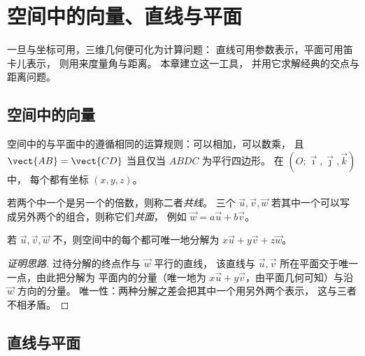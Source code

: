 \chapter{空间中的向量、直线与平面}\label{ch:g12:space}

一旦与坐标可用，三维几何便可化为计算问题：
直线可用参数表示，平面可用笛卡儿表示，
则用来度量角与距离。
本章建立这一工具，
并用它求解经典的交点与距离问题。

\section{空间中的向量}

空间中的与平面中的遵循相同的运算规则：可以相加，可以数乘，
且 $\vect{AB} = \vect{CD}$ 当且仅当 $ABDC$ 为平行四边形。
在 $(O; \vec\imath, \vec\jmath, \vec k)$ 中，
每个都有坐标 $(x, y, z)$。

\begin{definition}[共线与共面]\label{def:g12:space:collinear}
若两个中一个是另一个的倍数，则称二者\emph{共线}。
三个 $\vec u, \vec v, \vec w$ 若其中一个可以写成另外两个的组合，则称它们\emph{共面}，
例如
$\vec w = a\vec u + b\vec v$。
\end{definition}

\begin{proposition}\label{prop:g12:space:basis}
若 $\vec u, \vec v, \vec w$ 不，则空间中的每个都可唯一地分解为
$x\vec u + y\vec v + z\vec w$。
\end{proposition}

\begin{proof}[证明思路]
过待分解的终点作与 $\vec w$ 平行的直线，
该直线与 $\vec u, \vec v$ 所在平面交于唯一一点，由此把分解为
平面内的分量（唯一地为 $x\vec u + y\vec
v$，由平面几何可知）与沿 $\vec w$ 方向的分量。
唯一性：两种分解之差会把其中一个用另外两个表示，
这与三者不相矛盾。
\end{proof}

\section{直线与平面}

